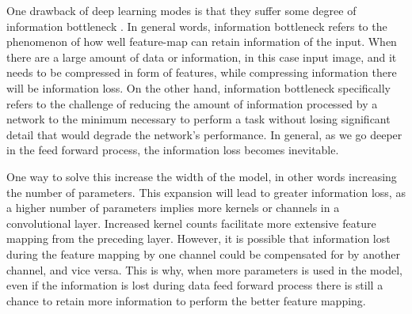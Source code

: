 



One  drawback of deep learning modes is that they suffer some degree of information bottleneck \cite{tishby2015deep,tishby2000information}. In general words, information bottleneck refers to the phenomenon of how well feature-map can retain information of the input. When there are a large amount of data or information, in this case input image, and it needs to be compressed in form of features, while compressing information there will be information loss. On the other hand, information bottleneck specifically refers to the challenge of reducing the amount of information processed by a network to the minimum necessary to perform a task without losing significant detail that would degrade the network's performance. In general, as we go deeper in the feed forward process, the information loss becomes inevitable. 

One way to solve this increase the width of the model, in other words increasing the number of parameters. This expansion will lead to greater information loss, as a higher number of parameters implies more kernels or channels in a convolutional layer. Increased kernel counts facilitate more extensive feature mapping from the preceding layer. However, it is possible that information lost during the feature mapping by one channel could be compensated for by another channel, and vice versa. This is why, when more parameters is used in the model, even if the information is lost during data feed forward process there is still a chance to retain more information to perform the better feature mapping. 


